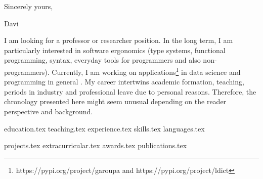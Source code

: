 \documentclass[letterpaper,11pt]{article}
\begin{document}
{\justifying
\Large
{}
\vspace{30pt}
\hspace{420pt} Sincerely yours,
\vspace{10pt}

\hspace{420pt} Davi
}

\newpage


\vspace{0.35cm}
{\justifying
I am looking for a professor or researcher position.
In the long term, I am particularly interested in software ergonomics (type systems, functional programming, syntax, everyday tools for programmers and also non-programmers).
Currently, I am working on applications\footnote{https://pypi.org/project/garoupa and https://pypi.org/project/ldict} in data science and programming in general \cite{pereirasantos2021predictable}. 
My career intertwins academic formation, teaching, periods in industry and professional leave due to personal reasons.
Therefore, the chronology presented here might seem unusual depending on the reader perspective and background.

}

{education.tex}
{teaching.tex}
\pagebreak
{experience.tex}
\sidebyside
    {{skills.tex}}
    {{languages.tex}}


{projects.tex}
\pagebreak
{extracurricular.tex}
{awards.tex}
{publications.tex}
\end{document}
